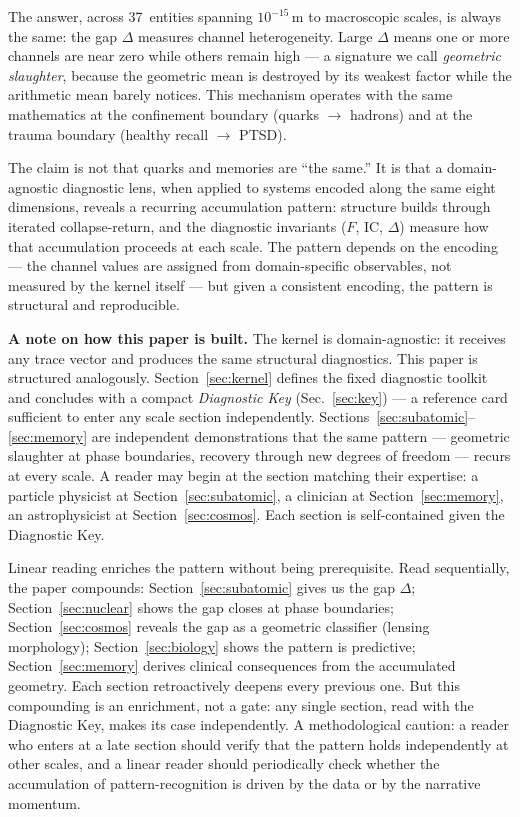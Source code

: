 \documentclass[
  aps,
  prd,
  twocolumn,
  superscriptaddress,
  nofootinbib,
  floatfix
]{revtex4-2}
\newcommand{\IC}{\mathrm{IC}}
\begin{document}
The answer, across 37~entities spanning $10^{-15}$\,m to
macroscopic scales, is always the same: the gap $\Delta$
measures channel heterogeneity.  Large $\Delta$ means one or
more channels are near zero while others remain high ---
a signature we call \emph{geometric slaughter}, because the
geometric mean is destroyed by its weakest factor while the
arithmetic mean barely notices.  This mechanism operates with
the same mathematics at the confinement boundary (quarks
$\to$ hadrons) and at the trauma boundary (healthy recall
$\to$ PTSD).

The claim is not that quarks and memories are ``the same.''
It is that a domain-agnostic diagnostic lens, when applied to
systems encoded along the same eight dimensions, reveals a
recurring accumulation pattern: structure builds through
iterated collapse-return, and the diagnostic invariants
($F$, $\IC$, $\Delta$) measure how that accumulation
proceeds at each scale.  The pattern depends on the encoding
--- the channel values are assigned from domain-specific
observables, not measured by the kernel itself --- but
given a consistent encoding, the pattern is structural
and reproducible.

\textbf{A note on how this paper is built.}
The kernel is domain-agnostic: it receives any trace vector
and produces the same structural diagnostics.  This paper is
structured analogously.  Section~\ref{sec:kernel} defines
the fixed diagnostic toolkit and concludes with a compact
\emph{Diagnostic Key} (Sec.~\ref{sec:key}) --- a reference
card sufficient to enter any scale section independently.
Sections~\ref{sec:subatomic}--\ref{sec:memory} are
independent demonstrations that the same pattern ---
geometric slaughter at phase boundaries, recovery through
new degrees of freedom --- recurs at every scale.  A reader
may begin at the section matching their expertise: a
particle physicist at Section~\ref{sec:subatomic}, a
clinician at Section~\ref{sec:memory}, an astrophysicist at
Section~\ref{sec:cosmos}.  Each section is self-contained
given the Diagnostic Key.

Linear reading enriches the pattern without being
prerequisite.  Read sequentially, the paper compounds:
Section~\ref{sec:subatomic} gives us the gap $\Delta$;
Section~\ref{sec:nuclear} shows the gap closes at phase
boundaries; Section~\ref{sec:cosmos} reveals the gap as a
geometric classifier (lensing morphology);
Section~\ref{sec:biology} shows the pattern is predictive;
Section~\ref{sec:memory} derives clinical consequences from
the accumulated geometry.  Each section retroactively
deepens every previous one.  But this compounding is an
enrichment, not a gate: any single section, read with the
Diagnostic Key, makes its case independently.
A methodological caution: a reader who enters at a late
section should verify that the pattern holds independently
at other scales, and a linear reader should periodically
check whether the accumulation of pattern-recognition is
driven by the data or by the narrative momentum.
\end{document}
